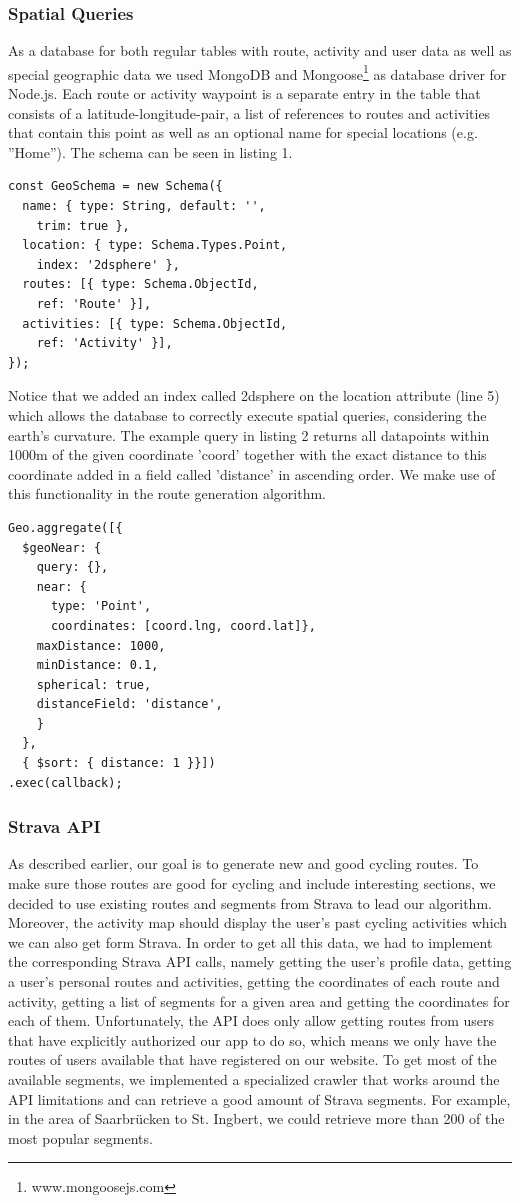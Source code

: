 \documentclass{sigchi}
\begin{document}
\subsubsection{Spatial Queries}
As a database for both regular tables with route, activity and user data as well as special geographic data we used MongoDB and Mongoose\footnote{www.mongoosejs.com} as database driver for Node.js. Each route or activity waypoint is a separate entry in the table that consists of a latitude-longitude-pair, a list of references to routes and activities that contain this point as well as an optional name for special locations (e.g. ''Home''). The schema can be seen in listing 1.
\begin{lstlisting}[caption=Geo Schema with Spatial Index]
const GeoSchema = new Schema({
  name: { type: String, default: '',
    trim: true },
  location: { type: Schema.Types.Point, 
    index: '2dsphere' },
  routes: [{ type: Schema.ObjectId, 
    ref: 'Route' }],
  activities: [{ type: Schema.ObjectId, 
    ref: 'Activity' }],
});
\end{lstlisting}
Notice that we added an index called 2dsphere on the location attribute (line 5) which allows the database to correctly execute spatial queries, considering the earth's curvature. The example query in listing 2 returns all datapoints within 1000m of the given coordinate 'coord' together with the exact distance to this coordinate added in a field called 'distance' in ascending order. We make use of this functionality in the route generation algorithm.
\begin{lstlisting}[caption=Sample Spatial Query]
Geo.aggregate([{
  $geoNear: {
    query: {},
    near: {
      type: 'Point',
      coordinates: [coord.lng, coord.lat]},
    maxDistance: 1000,
    minDistance: 0.1,
    spherical: true,
    distanceField: 'distance',
    }
  },
  { $sort: { distance: 1 }}])
.exec(callback);
\end{lstlisting}
\subsubsection{Strava API}
As described earlier, our goal is to generate new and good cycling routes. To make sure those routes are good for cycling and include interesting sections, we decided to use existing routes and segments from Strava to lead our algorithm. Moreover, the activity map should display the user's past cycling activities which we can also get form Strava. In order to get all this data, we had to implement the corresponding Strava API calls, namely getting the user's profile data, getting a user's personal routes and activities, getting the coordinates of each route and activity, getting a list of segments for a given area and getting the coordinates for each of them. Unfortunately, the API does only allow getting routes from users that have explicitly authorized our app to do so, which means we only have the routes of users available that have registered on our website. To get most of the available segments, we implemented a specialized crawler that works around the API limitations and can retrieve a good amount of Strava segments. For example, in the area of Saarbr\"ucken to St. Ingbert, we could retrieve more than 200 of the most popular segments.
\end{document}
